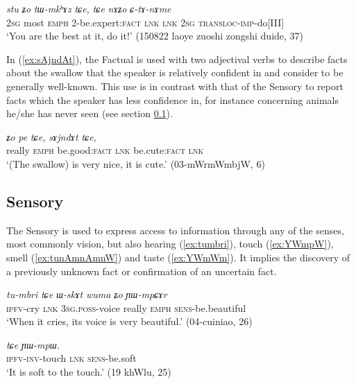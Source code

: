 \documentclass[oldfontcommands,oneside,a4paper,11pt]{article}
\newcommand{\ipa}[1]{{\phon\textit{#1}}} %
\newcommand{\refb}[1]{(\ref{#1})}
\begin{document}
\begin{exe}
\ex \label{ex:tWmkhAz}
\gll \ipa{nɤʑo} 	\ipa{stu} 	\ipa{ʑo} 	\ipa{tɯ-mkʰɤz} 	\ipa{tɕe,} 	\ipa{tɕe} 	\ipa{nɤʑo} 	\ipa{ɕ-tɤ-nɤme} \\
\textsc{2sg} most \textsc{emph} 2-be.expert:\textsc{fact}   \textsc{lnk} \textsc{lnk} \textsc{2sg} \textsc{transloc-imp}-do[III] \\
\glt `You are the best at it, do it!' (150822 laoye zuoshi zongshi duide, 37)
\end{exe}

In \refb{ex:sAjndAt}, the Factual is used with two adjectival verbs to describe facts about the swallow that the speaker is relatively confident in and consider to be generally well-known. This use is in contrast with that of the Sensory to report facts which the speaker has less confidence in, for instance concerning animals he/she has never seen (see section \ref{sec:sensory}).

\begin{exe}
\ex \label{ex:sAjndAt}
\gll	\ipa{wuma} 	\ipa{ʑo} 	\ipa{pe} 	\ipa{tɕe,} 	\ipa{sɤjndɤt} 	\ipa{tɕe,} \\
really  \textsc{emph} be.good:\textsc{fact} \textsc{lnk}  be.cute:\textsc{fact} \textsc{lnk} \\
\glt `(The swallow) is very nice, it is cute.' (03-mWrmWmbjW, 6)
\end{exe}


\subsection{Sensory} \label{sec:sensory}
The Sensory is used to express access to information through any of the senses, most commonly vision, but also hearing (\ref{ex:tumbri}), touch (\ref{ex:YWmpW}), smell (\ref{ex:tunAmnAmnW}) and taste (\ref{ex:YWmWm}). It implies the discovery of a previously unknown fact or confirmation of an uncertain fact.

\begin{exe}
\ex \label{ex:tumbri}
\gll
\ipa{tu-mbri} 	\ipa{tɕe} 	\ipa{ɯ-skɤt} 	\ipa{wuma} 	\ipa{ʑo} 	\ipa{ɲɯ-mpɕɤr} \\
\textsc{ipfv}-cry \textsc{lnk} \textsc{3sg.poss}-voice really \textsc{emph} \textsc{sens}-be.beautiful \\
\glt `When it cries, its voice is very beautiful.' (04-cuiniao, 26)
\end{exe}
\begin{exe}
\ex \label{ex:YWmpW}
\gll \ipa{ɲɯ́-wɣ-nɤmɤle} 	\ipa{tɕe} 	\ipa{ɲɯ-mpɯ.} \\
\textsc{ipfv-inv}-touch \textsc{lnk} \textsc{sens}-be.soft \\
\glt `It is soft to the touch.' (19 khWlu, 25)
\end{exe}
\end{document}
